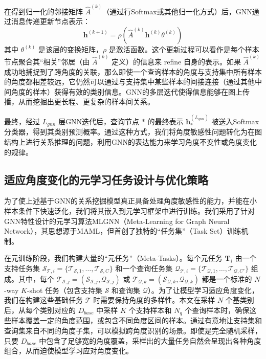 在得到归一化的邻接矩阵 $\hat{A}^{(k)}$（通过行Softmax或其他归一化方式）后，GNN通过消息传递更新节点表示：
\begin{equation}
    \mathbf{h}^{(k+1)} = \rho(\hat{A}^{(k)} \mathbf{h}^{(k)} \theta^{(k)})
    \label{eq:gnn_update_angle}
\end{equation}
其中 $\theta^{(k)}$ 是该层的变换矩阵，$\rho$ 是激活函数。这个更新过程可以看作是每个样本节点聚合其“相关”邻居（由 $\hat{A}^{(k)}$ 定义）的信息来 refine 自身的表示。如果 $\hat{A}^{(k)}$ 成功地捕捉到了跨角度的关联，那么即使一个查询样本的角度与支持集中所有样本的角度都相差较远，它仍然可以通过与支持集中某些样本的间接连接（通过其他中间角度的样本）获得有效的类别信息。GNN的多层迭代使得信息能够在图上传播，从而挖掘出更长程、更复杂的样本间关系。

最终，经过 $L_{gnn}$ 层GNN迭代后，查询节点 $*$ 的最终表示 $\mathbf{h}_*^{(L_{gnn})}$ 被送入Softmax分类器，得到其类别预测概率。通过这种方式，我们将角度敏感性问题转化为在图结构上进行关系推理的问题，利用GNN的表达能力来学习角度不变性或角度变化的规律。

\subsection{适应角度变化的元学习任务设计与优化策略}
\label{subsec:meta_learning_angle}

为了使上述基于GNN的关系挖掘模型真正具备处理角度敏感性的能力，并能在小样本条件下快速泛化，我们将其嵌入到元学习框架中进行训练。我们采用了针对GNN特性设计的元学习算法MLGNN（Meta-Learning for Graph Neural Network），其思想源于MAML，但首创了独特的“任务集”（Task Set）训练机制。

在元训练阶段，我们构建大量的“元任务”（Meta-Tasks）。每个元任务 $\mathbf{T}_i$ 由一个支持任务集 $\mathcal{S}_{\mathcal{T},i} = \{\mathcal{T}_{\mathcal{S},1}, \dots, \mathcal{T}_{\mathcal{S},C}\}$ 和一个查询任务集 $\mathcal{Q}_{\mathcal{T},i} = \{\mathcal{T}_{\mathcal{Q},1}, \dots, \mathcal{T}_{\mathcal{Q},C'}\}$ 组成。其中，每个 $\mathcal{T}_{\mathcal{S},j} = (\mathcal{S}_{\mathcal{S},j}, \mathcal{Q}_{\mathcal{S},j})$ 或 $\mathcal{T}_{\mathcal{Q},k} = (\mathcal{S}_{\mathcal{Q},k}, \mathcal{Q}_{\mathcal{Q},k})$ 都是一个标准的 $N$-way $K$-shot 任务（包含支持集 $\mathcal{S}$ 和查询集 $\mathcal{Q}$）。为了让模型学习适应角度变化，我们在构建这些基础任务 $\mathcal{T}$ 时需要保持角度的多样性。本文在采样 $N$ 个基类别后，从每个类别对应的 $D_{base}$ 中采样 $K$ 个支持样本和 $N_q$ 个查询样本时，确保这些样本覆盖一定的角度范围，或包含不同角度区间的样本。通过有意地让支持集和查询集来自不同的角度子集，可以模拟跨角度识别的场景。即使是完全随机采样，只要 $D_{base}$ 中包含了足够宽的角度覆盖，采样出的大量任务自然会呈现出各种角度组合，从而迫使模型学习应对角度变化。

